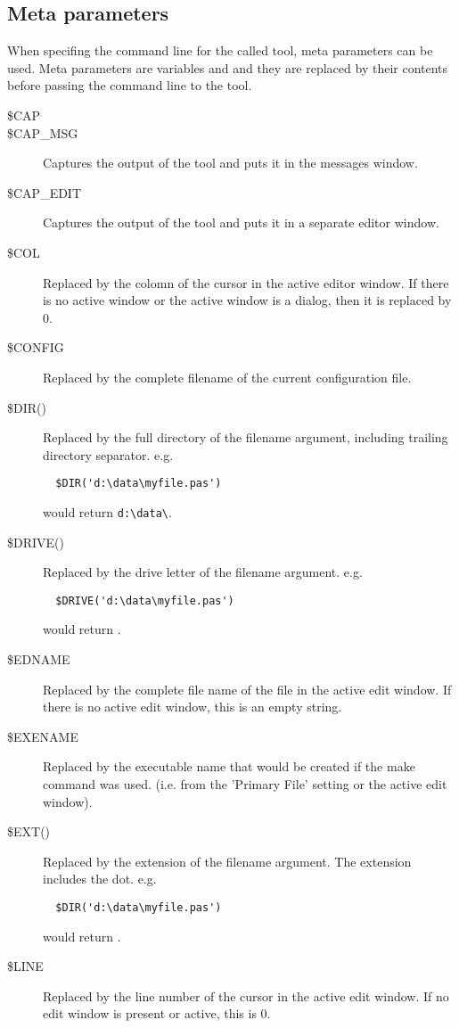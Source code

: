 \subsection{Meta parameters}
When specifing the command line for the called tool, meta parameters can
be used. Meta parameters are variables and and they are replaced
by their contents before passing the command line to the tool.

\begin{description}
\item[\$CAP] 
\item[\$CAP\_MSG]
Captures the output of the tool and puts it in the messages window.
\item[\$CAP\_EDIT]
Captures the output of the tool and puts it in a separate editor window.
\item[\$COL]
Replaced by the colomn of the cursor in the active editor window. If there is no
 active window or the active window is a dialog, then it is replaced by 0.
\item[\$CONFIG]
Replaced by the complete filename of the current configuration file.
\item[\$DIR()]
Replaced by the full directory of the filename argument, including trailing
directory separator. e.g.
\begin{verbatim}
  $DIR('d:\data\myfile.pas')
\end{verbatim}
would return \verb|d:\data\|.
\item[\$DRIVE()]
Replaced by the drive letter of the filename argument. e.g.
\begin{verbatim}
  $DRIVE('d:\data\myfile.pas')
\end{verbatim}
would return .
\item[\$EDNAME]
Replaced by the complete file name of the file in the active edit window.
If there is no active edit window, this is an empty string.
\item[\$EXENAME]
Replaced by the executable name that would be created if the make command
was used. (i.e. from the 'Primary File' setting or the active edit window).
\item[\$EXT()]
Replaced by the extension of the filename argument.
The extension includes the dot.
e.g.
\begin{verbatim}
  $DIR('d:\data\myfile.pas')
\end{verbatim}
would return .
\item[\$LINE]
Replaced by the line number of the cursor in the active edit window.
If no edit window is present or active, this is 0.

\end{description}
